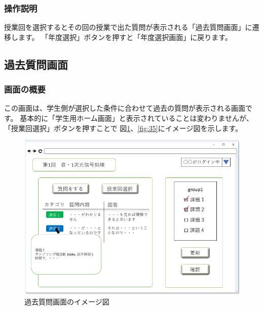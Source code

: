 \subsubsection{操作説明}
授業回を選択するとその回の授業で出た質問が表示される「過去質問画面」に遷移します。
「年度選択」ボタンを押すと「年度選択画面」に戻ります。

\newpage

\subsection{過去質問画面}
\subsubsection{画面の概要}
この画面は、学生側が選択した条件に合わせて過去の質問が表示される画面です。
基本的に「学生用ホーム画面」と表示されていることは変わりませんが、「授業回選択」ボタンを押すことで
図\ref{fig:34}、\ref{fig:35}にイメージ図を示します。

\begin{figure}[htbp]
\begin{center}
  \includegraphics[width=1\linewidth,clip]{./img/34.png}
  \caption{過去質問画面のイメージ図}\label{fig:34}
\end{center}
\end{figure}

